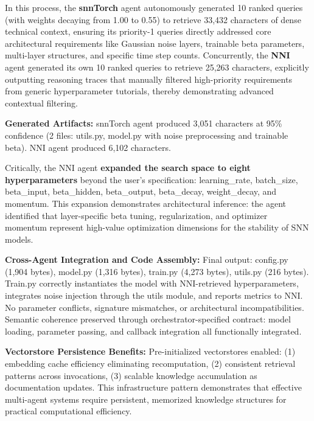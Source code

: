 In this process, the \textbf{snnTorch} agent autonomously generated 10 ranked queries (with weights decaying from 1.00 to 0.55) to retrieve 33,432 characters of dense technical context, ensuring its priority-1 queries directly addressed core architectural requirements like Gaussian noise layers, trainable beta parameters, multi-layer structures, and specific time step counts. Concurrently, the \textbf{NNI} agent generated its own 10 ranked queries to retrieve 25,263 characters, explicitly outputting reasoning traces that manually filtered high-priority requirements from generic hyperparameter tutorials, thereby demonstrating advanced contextual filtering.

\vspace{0.3cm}

\noindent \textbf{Generated Artifacts:} snnTorch agent produced 3,051 characters at 95\% confidence (2 files: utils.py, model.py with noise preprocessing and trainable beta). NNI agent produced 6,102 characters.

Critically, the NNI agent \textbf{expanded the search space to eight hyperparameters} beyond the user's specification: learning\_rate, batch\_size, beta\_input, beta\_hidden, beta\_output, beta\_decay, weight\_decay, and momentum. This expansion demonstrates architectural inference: the agent identified that layer-specific beta tuning, regularization, and optimizer momentum represent high-value optimization dimensions for the stability of SNN models.

\vspace{0.3cm}

\noindent \textbf{Cross-Agent Integration and Code Assembly:} Final output: config.py (1,904 bytes), model.py (1,316 bytes), train.py (4,273 bytes), utils.py (216 bytes). Train.py correctly instantiates the model with NNI-retrieved hyperparameters, integrates noise injection through the utils module, and reports metrics to NNI. No parameter conflicts, signature mismatches, or architectural incompatibilities. Semantic coherence preserved through orchestrator-specified contract: model loading, parameter passing, and callback integration all functionally integrated.

\vspace{0.3cm}

\noindent \textbf{Vectorstore Persistence Benefits:} Pre-initialized vectorstores enabled: (1) embedding cache efficiency eliminating recomputation, (2) consistent retrieval patterns across invocations, (3) scalable knowledge accumulation as documentation updates. This infrastructure pattern demonstrates that effective multi-agent systems require persistent, memorized knowledge structures for practical computational efficiency.

